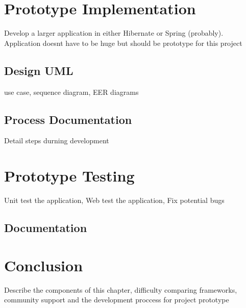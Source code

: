 \section{Prototype Implementation}
Develop a larger application in either Hibernate or Spring (probably).
Application doesnt have to be huge but should be prototype for this project
\subsection{Design UML}
use case, sequence diagram, EER diagrams
\subsection{Process Documentation}
Detail steps durning development

\section{Prototype Testing}
Unit test the application, Web test the application, Fix potential bugs
\subsection{Documentation}

\section{Conclusion}
Describe the components of this chapter, difficulty comparing frameworks, community support
and the development proccess for project prototype
